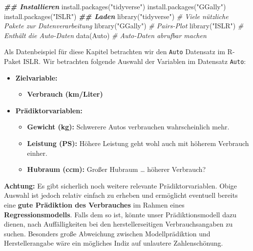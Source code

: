 \documentclass[
  ngerman,
]{book}
\newenvironment{Shaded}{\begin{snugshade}}{\end{snugshade}}
\newcommand{\CommentTok}[1]{\textcolor[rgb]{0.56,0.35,0.01}{\textit{#1}}}
\newcommand{\DocumentationTok}[1]{\textcolor[rgb]{0.56,0.35,0.01}{\textbf{\textit{#1}}}}
\newcommand{\FunctionTok}[1]{\textcolor[rgb]{0.00,0.00,0.00}{#1}}
\newcommand{\NormalTok}[1]{#1}
\newcommand{\StringTok}[1]{\textcolor[rgb]{0.31,0.60,0.02}{#1}}
\providecommand{\tightlist}{%
  \setlength{\itemsep}{0pt}\setlength{\parskip}{0pt}}
\begin{document}
\begin{Shaded}
\begin{Highlighting}[]
\DocumentationTok{\#\# Installieren}
\FunctionTok{install.packages}\NormalTok{(}\StringTok{"tidyverse"}\NormalTok{) }
\FunctionTok{install.packages}\NormalTok{(}\StringTok{"GGally"}\NormalTok{)    }
\FunctionTok{install.packages}\NormalTok{(}\StringTok{"ISLR"}\NormalTok{)      }
\DocumentationTok{\#\# Laden}
\FunctionTok{library}\NormalTok{(}\StringTok{"tidyverse"}\NormalTok{) }\CommentTok{\# Viele nützliche Pakete zur Datenverarbeitung}
\FunctionTok{library}\NormalTok{(}\StringTok{"GGally"}\NormalTok{)    }\CommentTok{\# Pairs{-}Plot}
\FunctionTok{library}\NormalTok{(}\StringTok{"ISLR"}\NormalTok{)      }\CommentTok{\# Enthält die Auto{-}Daten}
\FunctionTok{data}\NormalTok{(Auto)           }\CommentTok{\# Auto{-}Daten abrufbar machen}
\end{Highlighting}
\end{Shaded}

Als Datenbeispiel für diese Kapitel betrachten wir den \texttt{Auto} Datensatz im R-Paket ISLR. Wir betrachten folgende Auswahl der Variablen im Datensatz \texttt{Auto}:

\begin{itemize}
\tightlist
\item
  \textbf{Zielvariable:}

  \begin{itemize}
  \tightlist
  \item
    \textbf{Verbrauch (km/Liter)}
  \end{itemize}
\item
  \textbf{Prädiktorvariablen:}

  \begin{itemize}
  \tightlist
  \item
    \textbf{Gewicht (kg):} Schwerere Autos verbrauchen wahrscheinlich mehr.
  \item
    \textbf{Leistung (PS):} Höhere Leistung geht wohl auch mit höherem Verbrauch einher.
  \item
    \textbf{Hubraum (ccm):} Großer Hubraum \ldots{} höherer Verbrauch?
  \end{itemize}
\end{itemize}

\textbf{Achtung:} Es gibt sicherlich noch weitere relevante Prädiktorvariablen. Obige Auswahl ist jedoch relativ einfach zu erheben und ermöglicht eventuell bereits eine \textbf{gute Prädiktion des Verbrauches} im Rahmen eines \textbf{Regressionsmodells}. Falls dem so ist, könnte unser Prädiktionsmodell dazu dienen, nach Auffälligkeiten bei den herstellerseitigen Verbrauchsangaben zu suchen. Besonders große Abweichung zwischen Modellprädiktion und Herstellerangabe wäre ein mögliches Indiz auf unlautere Zahlenschönung.
\end{document}
